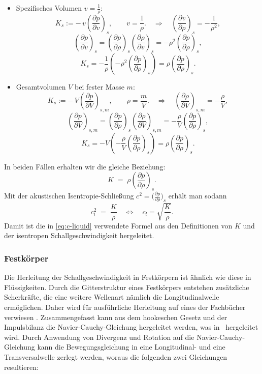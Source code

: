 \begin{itemize}
    \item Spezifisches Volumen $v = \frac{1}{\rho}$:
    \[
    K_s := -\,v\left(\frac{\partial p}{\partial v}\right)_{s},\qquad v=\frac{1}{\rho}.
    \quad\Rightarrow\quad
    \left(\frac{\partial v}{\partial \rho}\right)_{s} = -\frac{1}{\rho^2},
    \]
    \[
    \left(\frac{\partial p}{\partial v}\right)_{s}
    = \left(\frac{\partial p}{\partial \rho}\right)_{s}\left(\frac{\partial \rho}{\partial v}\right)_{s}
    = -\rho^2\left(\frac{\partial p}{\partial \rho}\right)_{s},
    \]
    \[
    K_s = -\frac{1}{\rho}\left(-\rho^2\left(\frac{\partial p}{\partial \rho}\right)_{s}\right)
    = \rho\left(\frac{\partial p}{\partial \rho}\right)_{s}.
    \]

\item Gesamtvolumen $V$ bei fester Masse $m$:
    \[
    K_s := -\,V\left(\frac{\partial p}{\partial V}\right)_{s,m},\qquad \rho=\frac{m}{V}.
    \quad\Rightarrow\quad
    \left(\frac{\partial \rho}{\partial V}\right)_{s,m} = -\frac{\rho}{V},
    \]
    \[
    \left(\frac{\partial p}{\partial V}\right)_{s,m}
    = \left(\frac{\partial p}{\partial \rho}\right)_{s}\left(\frac{\partial \rho}{\partial V}\right)_{s,m}
    = -\frac{\rho}{V}\left(\frac{\partial p}{\partial \rho}\right)_{s},
    \]
    \[
    K_s = -V\left(-\frac{\rho}{V}\left(\frac{\partial p}{\partial \rho}\right)_{s}\right)
    = \rho\left(\frac{\partial p}{\partial \rho}\right)_{s}.
    \]
\end{itemize}
In beiden Fällen erhalten wir die gleiche Beziehung:
\begin{equation}
    K \;=\; \rho\left(\frac{\partial p}{\partial \rho}\right)_{s}.
\end{equation}
Mit der akustischen Isentropie-Schließung $c^2=\big(\frac{\partial p}{\partial \rho}\big)_s$
erhält man sodann
\begin{equation}
    c_l^2 \;=\; \frac{K}{\rho} \quad \Leftrightarrow \quad c_l=\sqrt{\frac{K}{\rho}}.
\end{equation}
Damit ist die in \eqref{eq:c-liquid} verwendete Formel aus den Definitionen von $K$
und der isentropen Schallgeschwindigkeit hergeleitet.

\subsubsection*{Festkörper}
Die Herleitung der Schallgeschwindigkeit in Festkörpern ist ähnlich wie diese
in Flüssigkeiten. Durch die Gitterstruktur eines Festkörpers entstehen
zusätzliche Scherkräfte, die eine weitere Wellenart nämlich die
Longitudinalwelle ermöglichen. Daher wird für ausführliche Herleitung
auf eines der Fachbücher verwiesen \cite{schall:landaulifschitz,schall:gurtin}.
Zusammengefasst kann aus dem hookeschen Gesetz und der Impulsbilanz
die Navier-Cauchy-Gleichung hergeleitet werden, was in~\cite{openfoam:navierstokes}
hergeleitet wird.
Durch Anwendung von Divergenz und Rotation auf die Navier-Cauchy-Gleichung
kann die Bewegungsgleichung in eine Longitudinal- und eine Transversalwelle
zerlegt werden, woraus die folgenden zwei Gleichungen resultieren:

